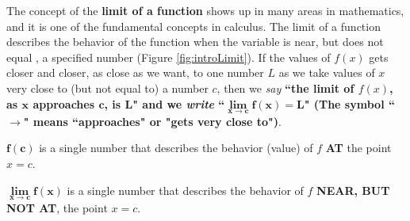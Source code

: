 \noindent The concept of the \textbf{limit of a function} shows up in many areas in mathematics, and it is one of the fundamental concepts in calculus.  The limit of a function describes the behavior of the function when the variable is near, but does not equal , a specified number (Figure \ref{fig:introLimit}). If the values of $f(x)$ gets closer and closer, as close as we want, to one number $L$ as we take values of $x$ very close to (but not equal to) a number $c$, then we \emph{say} \textbf{``the limit of \(f(x)\), as $\bm{x}$ approaches $\bm{c}$, is $\bm{L}$" and we \emph{write} ``\(\bm{\lim\limits_{x \to c} f(x)=L}\)" (The symbol ``\(\bm{\rightarrow}\)" means ``approaches" or "gets very close to")}.\\
\begin{spacing}{2}
\begin{tcolorbox}

\(\bm{f(c)}\) is a single number that describes the behavior (value) of \(f\) \textbf{AT} the point \(x=c\).

\(\bm{\displaystyle\lim\limits_{x \to c} f(x)}\) is a single number that describes the behavior of \(f\) \textbf{NEAR, BUT NOT AT}, the point \(x=c\).
\end{tcolorbox}
\end{spacing}
\vspace{-0.25in}

\begin{comment}
In terms of vocabulary, we will discuss what is meant by phrases such as:  “as x \textbf{approaches} a” (denoted by \(x\rightarrow a\));  “arbitrarily close”; and “as x approaches infinity” (denoted by \(x\rightarrow \infty\)).   \\
\end{comment}


